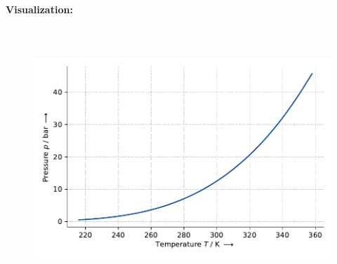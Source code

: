 \textbf{Visualization:}
%
\begin{figure}[!htp]
{\noindent\includegraphics[height=10cm, keepaspectratio]{figs/ref/ref_R-407c_VaporPressure_EoS1_1.pdf}}
\end{figure}
%

\FloatBarrier
\newpage
